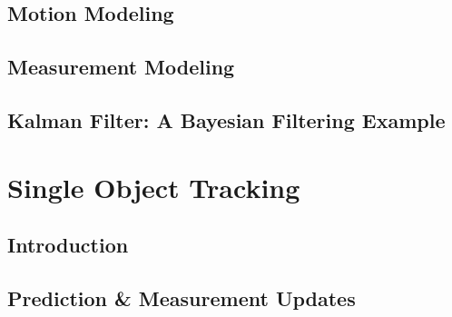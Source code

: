 \documentclass{beamer}
\begin{document}
	\subsection{Motion Modeling}
	\subsection{Measurement Modeling}
	\subsection{Kalman Filter: A Bayesian Filtering Example}
	\section{Single Object Tracking}	
	\subsection{Introduction}
	\subsection{Prediction \& Measurement Updates}
\end{document}
